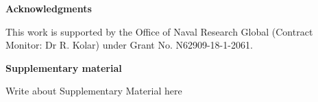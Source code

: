 \documentclass[twocolumn,10pt]{article} %
\newcommand{\acknowledgement}%
              [1]%
              {%
               \bgroup%
               \flushleft%
               \small\bf%
               #1%
               \par%
               \egroup%
              }%
\begin{document}

\acknowledgement{Acknowledgments} \addvspace{10pt}

This work is supported by the Office of Naval Research Global (Contract Monitor: Dr R. Kolar) under Grant No. N62909-18-1-2061.

\acknowledgement{Supplementary material} \addvspace{10pt}

Write about Supplementary Material here


\end{document}
